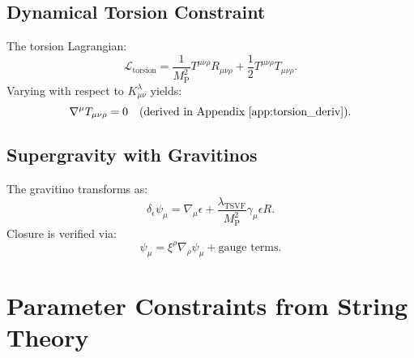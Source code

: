 \documentclass[12pt, onecolumn]{article}
\theoremstyle{definition}
\newcommand{\tsvf}{\lambda_{\mathrm{TSVF}}}
\newcommand{\Mp}{M_{\mathrm{P}}}
\numberwithin{equation}{section}
\begin{document}
\subsection{Dynamical Torsion Constraint}
The torsion Lagrangian:
\begin{equation}
\mathcal{L}_{\text{torsion}} = \frac{1}{\Mp^2} T^{\mu\nu\rho} R_{\mu\nu\rho} + \frac{1}{2} T^{\mu\nu\rho} T_{\mu\nu\rho}.
\end{equation}
Varying with respect to \(K^\lambda_{\mu\nu}\) yields:
\begin{equation}
\nabla^\mu T_{\mu\nu\rho} = 0 \quad \text{(derived in Appendix~\ref{app:torsion_deriv})}.
\end{equation}

\subsection{Supergravity with Gravitinos}
The gravitino transforms as:
\begin{equation}
\delta_\epsilon \psi_\mu = \nabla_\mu \epsilon + \frac{\tsvf}{\Mp^2} \gamma_\mu \epsilon R.
\end{equation}
Closure is verified via:
\begin{equation}
[\delta_{\epsilon_1}, \delta_{\epsilon_2}] \psi_\mu = \xi^\rho \nabla_\rho \psi_\mu + \text{gauge terms}.
\end{equation}

\section{Parameter Constraints from String Theory}
\label{sec:param_constraints}
\end{document}
